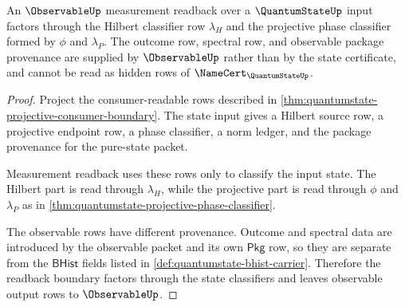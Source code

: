 \begin{theorem}
\label{thm:quantumstate-observable-measurement-readback-boundary}
An $\ObservableUp$ measurement readback over a $\QuantumStateUp$ input factors
through the Hilbert classifier row $\lambda_H$ and the projective phase
classifier formed by $\phi$ and $\lambda_P$. The outcome row, spectral row, and
observable package provenance are supplied by $\ObservableUp$ rather than by the
state certificate, and cannot be read as hidden rows of
$\NameCert_{\QuantumStateUp}$.
\end{theorem}
\begin{proof}
Project the consumer-readable rows described in
\autoref{thm:quantumstate-projective-consumer-boundary}. The state input gives a
Hilbert source row, a projective endpoint row, a phase classifier, a norm ledger,
and the package provenance for the pure-state packet.

Measurement readback uses these rows only to classify the input state. The
Hilbert part is read through $\lambda_H$, while the projective part is read
through $\phi$ and $\lambda_P$ as in
\autoref{thm:quantumstate-projective-phase-classifier}.

The observable rows have different provenance. Outcome and spectral data are
introduced by the observable packet and its own $\mathsf{Pkg}$ row, so they are
separate from the $\mathsf{BHist}$ fields listed in
\autoref{def:quantumstate-bhist-carrier}. Therefore the readback boundary
factors through the state classifiers and leaves observable output rows to
$\ObservableUp$.
\end{proof}

